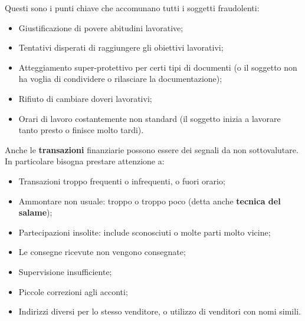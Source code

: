 Questi sono i punti chiave che accomunano tutti i soggetti fraudolenti:
\begin{itemize}
  \item Giustificazione di povere abitudini lavorative;
  \item Tentativi disperati di raggiungere gli obiettivi lavorativi;
  \item Atteggiamento super-protettivo per certi tipi di documenti (o il 
  soggetto non ha voglia di condividere o rilasciare la documentazione);
  \item Rifiuto di cambiare doveri lavorativi;
  \item Orari di lavoro costantemente non standard (il soggetto inizia a 
  lavorare tanto presto o finisce molto tardi).
\end{itemize}

Anche le \textbf{transazioni} finanziarie possono essere dei segnali da non 
sottovalutare. In particolare bisogna prestare attenzione a:
\begin{itemize}
  \item Transazioni troppo frequenti o infrequenti, o fuori orario;
  \item Ammontare non usuale: troppo o troppo poco (detta anche
  \textbf{tecnica del salame});
  \item Partecipazioni insolite: include sconosciuti o molte parti molto vicine;
  \item Le consegne ricevute non vengono consegnate;
  \item Supervisione insufficiente;
  \item Piccole correzioni agli acconti;
  \item Indirizzi diversi per lo stesso venditore, o utilizzo di venditori con 
  nomi simili.
\end{itemize}
